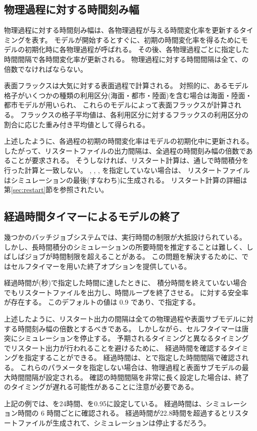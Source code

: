 \subsection{物理過程に対する時間刻み幅}

物理過程に対する時間刻み幅は、各物理過程が与える時間変化率を更新するタイミングを表す。
モデルが開始するとすぐに、初期の時間変化率を得るためにモデルの初期化時に各物理過程が呼ばれる。
その後、各物理過程ごとに指定した時間間隔で各時間変化率が更新される。
物理過程に対する時間間隔は全て、の倍数でなければならない。

表面フラックスは大気に対する表面過程で計算される。
対照的に、あるモデル格子がいくつかの種類の利用区分(海面・都市・陸面)を含む場合は海面・陸面・都市モデルが用いられ、
これらのモデルによって表面フラックスが計算される。
フラックスの格子平均値は、各利用区分に対するフラックスの利用区分の割合に応じた重み付き平均値として得られる。

上述したように、各過程の初期の時間変化率はモデルの初期化中に更新される。
したがって、リスタートファイルの出力間隔は、全過程の時間刻み幅の倍数であることが要求される。
そうしなければ、リスタート計算は、通しで時間積分を行った計算と一致しない。
, ,  ,  を指定していない場合は、
リスタートファイルはシミュレーションの最後(すなわち)に生成される。
リスタート計算の詳細は第\ref{sec:restart}節を参照されたい。


\subsection{経過時間タイマーによるモデルの終了} \label{subsec:wallclock_check}

幾つかのバッチジョブシステムでは、実行時間の制限が大抵設けられている。
しかし、長時間積分のシミュレーションの所要時間を推定することは難しく、しばしばジョブが時間制限を超えることがある。
この問題を解決するために、{\scalerm}ではセルフタイマーを用いた終了オプションを提供している。

経過時間が(秒)で指定した時間に達したときに、
積分時間を終えていない場合でもリスタートファイルを出力し、時間ループを終了させる。
に対する安全率が存在する。
このデフォルトの値は 0.9 であり、で指定する。

上述したように、リスタート出力の間隔は全ての物理過程や表面サブモデルに対する時間刻み幅の倍数とするべきである。
しかしながら、セルフタイマーは唐突にシミュレーションを停止する。
予期されるタイミングと異なるタイミングでリスタート出力が行われることを避けるために、
経過時間を確認するタイミングを指定することができる。
経過時間は、とで指定した時間間隔で確認される。
これらのパラメータを指定しない場合は、物理過程と表面サブモデルの最大時間間隔が設定される。
確認の時間間隔を非常に長く設定した場合は、終了のタイミングが遅れる可能性があることに注意が必要である。

上記の例では、を24時間、を0.95に設定している。
経過時間は、シミュレーション時間の 6 時間ごとに確認される。
経過時間が22.8時間を超過するとリスタートファイルが生成されて、シミュレーションは停止するだろう。
